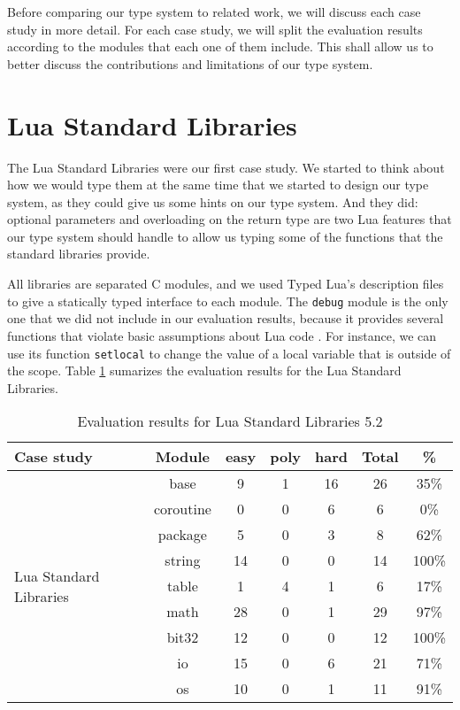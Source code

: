 Before comparing our type system to related work, we will discuss
each case study in more detail.
For each case study, we will split the evaluation results according
to the modules that each one of them include.
This shall allow us to better discuss the contributions and limitations
of our type system.

\section{Lua Standard Libraries}

The Lua Standard Libraries \citep{luamanual} were our first case study.
We started to think about how we would type them at the same time that
we started to design our type system, as they could give us some hints
on our type system.
And they did: optional parameters and overloading on the return type
are two Lua features that our type system should handle to allow us
typing some of the functions that the standard libraries provide.

All libraries are separated C modules, and we used Typed Lua's description
files to give a statically typed interface to each module.
The \texttt{debug} module is the only one that we did not include in our
evaluation results, because it provides several functions that violate
basic assumptions about Lua code \citep{luamanual}.
For instance, we can use its function \texttt{setlocal} to change the value
of a local variable that is outside of the scope.
Table \ref{tab:evallsl} sumarizes the evaluation results for the Lua Standard Libraries.

\begin{table}[!ht]
\begin{center}
\begin{tabular}{|l|c|c|c|c|c|c|}
\hline
\textbf{Case study} & \textbf{Module} & \textbf{easy} & \textbf{poly} & \textbf{hard} & \textbf{Total} & \textbf{\%} \\
\hline
\multirow{9}{*}{Lua Standard Libraries}
& base & 9 & 1 & 16 & 26 & 35\% \\
\cline{2-7}
& coroutine & 0 & 0 & 6 & 6 & 0\% \\
\cline{2-7}
& package & 5 & 0 & 3 & 8 & 62\% \\
\cline{2-7}
& string & 14 & 0 & 0 & 14 & 100\% \\
\cline{2-7}
& table & 1 & 4 & 1 & 6 & 17\% \\
\cline{2-7}
& math & 28 & 0 & 1 & 29 & 97\% \\
\cline{2-7}
& bit32 & 12 & 0 & 0 & 12 & 100\% \\
\cline{2-7}
& io & 15 & 0 & 6 & 21 & 71\% \\
\cline{2-7}
& os & 10 & 0 & 1 & 11 & 91\% \\
\hline
\end{tabular}
\end{center}
\caption{Evaluation results for Lua Standard Libraries 5.2}
\label{tab:evallsl}
\end{table}


